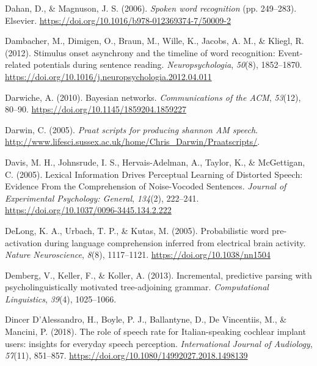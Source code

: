 \documentclass[a4paper, nobind]{templates/ociamthesis}
\newlength{\cslhangindent}
\newenvironment{CSLReferences}[2] %
 {%
  \setlength{\parindent}{0pt}
  \ifodd #1
  \let\oldpar\par
  \def\par{\hangindent=\cslhangindent\oldpar}
  \fi
  \setlength{\parskip}{1mm}
  \setlength{\baselineskip}{6mm}
 }%
 {}
\begin{document}
\begin{CSLReferences}{1}{0}
\leavevmode{}%
Dahan, D., \& Magnuson, J. S. (2006). \emph{Spoken word recognition} (pp. 249--283). Elsevier. \url{https://doi.org/10.1016/b978-012369374-7/50009-2}

\leavevmode{}%
Dambacher, M., Dimigen, O., Braun, M., Wille, K., Jacobs, A. M., \& Kliegl, R. (2012). {Stimulus onset asynchrony and the timeline of word recognition: Event-related potentials during sentence reading}. \emph{Neuropsychologia}, \emph{50}(8), 1852--1870. \url{https://doi.org/10.1016/j.neuropsychologia.2012.04.011}

\leavevmode{}%
Darwiche, A. (2010). Bayesian networks. \emph{Communications of the ACM}, \emph{53}(12), 80--90. \url{https://doi.org/10.1145/1859204.1859227}

\leavevmode{}%
Darwin, C. (2005). \emph{Praat scripts for producing shannon AM speech}. \url{http://www.lifesci.sussex.ac.uk/home/Chris_Darwin/Praatscripts/}.

\leavevmode{}%
Davis, M. H., Johnsrude, I. S., Hervais-Adelman, A., Taylor, K., \& McGettigan, C. (2005). Lexical Information Drives Perceptual Learning of Distorted Speech: Evidence From the Comprehension of Noise-Vocoded Sentences. \emph{Journal of Experimental Psychology: General}, \emph{134}(2), 222--241. \url{https://doi.org/10.1037/0096-3445.134.2.222}

\leavevmode{}%
DeLong, K. A., Urbach, T. P., \& Kutas, M. (2005). Probabilistic word pre-activation during language comprehension inferred from electrical brain activity. \emph{Nature Neuroscience}, \emph{8}(8), 1117--1121. \url{https://doi.org/10.1038/nn1504}

\leavevmode{}%
Demberg, V., Keller, F., \& Koller, A. (2013). Incremental, predictive parsing with psycholinguistically motivated tree-adjoining grammar. \emph{Computational Linguistics}, \emph{39}(4), 1025--1066.

\leavevmode{}%
Dincer D'Alessandro, H., Boyle, P. J., Ballantyne, D., De Vincentiis, M., \& Mancini, P. (2018). {The role of speech rate for Italian-speaking cochlear implant users: insights for everyday speech perception}. \emph{International Journal of Audiology}, \emph{57}(11), 851--857. \url{https://doi.org/10.1080/14992027.2018.1498139}


\end{CSLReferences}
\end{document}
